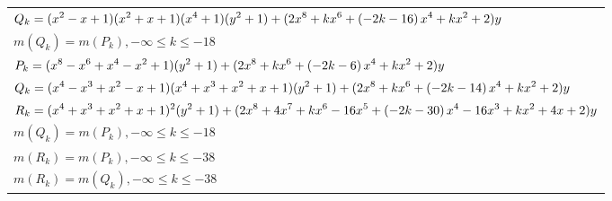 \documentclass{amsart}
\begin{document}
\begin{longtable}{|l|}
\(\displaystyle Q_k=(x^2
 - x
 + 1)(x^2
 + x
 + 1)(x^4
 + 1)(y^2+1)+(2\*x^8
 + k\*x^6
 + \left(-2\*k
 - 16\right) \*x^4
 + k\*x^2
 + 2)y\)\\
\(\displaystyle m(Q_k) = m(P_{k}),-\infty \leqslant k \leqslant -18\)\\
\hline
\(\displaystyle P_k=(x^8
 - x^6
 + x^4
 - x^2
 + 1)(y^2+1)+(2\*x^8
 + k\*x^6
 + \left(-2\*k
 - 6\right) \*x^4
 + k\*x^2
 + 2)y\)\\
\(\displaystyle Q_k=(x^4
 - x^3
 + x^2
 - x
 + 1)(x^4
 + x^3
 + x^2
 + x
 + 1)(y^2+1)+(2\*x^8
 + k\*x^6
 + \left(-2\*k
 - 14\right) \*x^4
 + k\*x^2
 + 2)y\)\\
\(\displaystyle R_k=(x^4
 + x^3
 + x^2
 + x
 + 1)^{2}(y^2+1)+(2\*x^8
 + 4\*x^7
 + k\*x^6
 - 16\*x^5
 + \left(-2\*k
 - 30\right) \*x^4
 - 16\*x^3
 + k\*x^2
 + 4\*x
 + 2)y\)\\
\(\displaystyle m(Q_k) = m(P_{k}),-\infty \leqslant k \leqslant -18\)\\
\(\displaystyle m(R_k) = m(P_{k}),-\infty \leqslant k \leqslant -38\)\\
\(\displaystyle m(R_k) = m(Q_{k}),-\infty \leqslant k \leqslant -38\)\\
\hline
\end{longtable}
\end{document}
